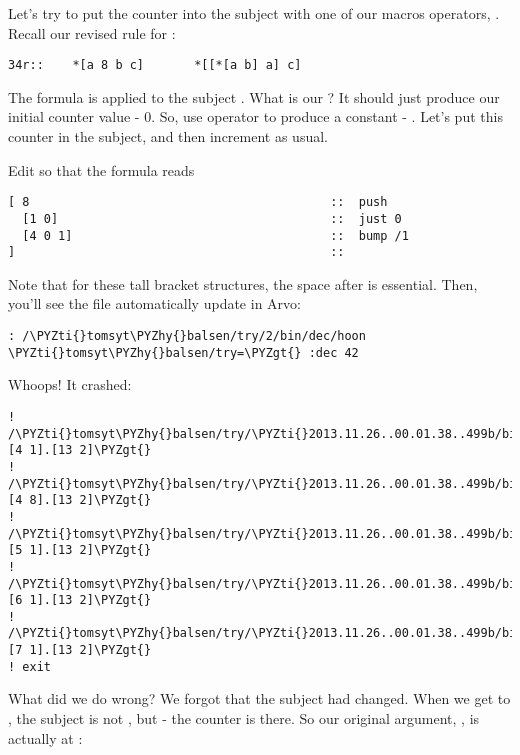 Let's try to put the counter into the subject with one of our
macros operators, .  Recall our revised rule for :

\begin{framed_shaded}
\begin{Verbatim}[fontsize=\relsize{-2.5},fontseries=b,commandchars=\\\{\}]
34r::    *[a 8 b c]       *[[*[a b] a] c]
\end{Verbatim}
\end{framed_shaded}
The formula  is applied to the subject \kode{[*[a b] a]}.  What is
our ?  It should just produce our initial counter value - 0.
So, use operator  to produce a constant - \kode{[1 0]}.  Let's
put this counter in the subject, and then increment as usual.

Edit  so that the formula reads

\begin{framed_shaded}
\begin{Verbatim}[fontsize=\relsize{-2.5},fontseries=b,commandchars=\\\{\}]
[ 8                                          ::  push
  [1 0]                                      ::  just 0
  [4 0 1]                                    ::  bump /1
]                                            ::
\end{Verbatim}
\end{framed_shaded}
Note that for these tall bracket structures, the space after \kode{[}
is essential.  Then, you'll see the file automatically update in
Arvo:

\begin{framed_shaded}
\begin{Verbatim}[fontsize=\relsize{-2.5},fontseries=b,commandchars=\\\{\}]
: /\PYZti{}tomsyt\PYZhy{}balsen/try/2/bin/dec/hoon
\PYZti{}tomsyt\PYZhy{}balsen/try=\PYZgt{} :dec 42
\end{Verbatim}
\end{framed_shaded}
Whoops!  It crashed:

\begin{framed_shaded}
\begin{Verbatim}[fontsize=\relsize{-2.5},fontseries=b,commandchars=\\\{\}]
! /\PYZti{}tomsyt\PYZhy{}balsen/try/\PYZti{}2013.11.26..00.01.38..499b/bin/dec/:\PYZlt{}[4 1].[13 2]\PYZgt{}
! /\PYZti{}tomsyt\PYZhy{}balsen/try/\PYZti{}2013.11.26..00.01.38..499b/bin/dec/:\PYZlt{}[4 8].[13 2]\PYZgt{}
! /\PYZti{}tomsyt\PYZhy{}balsen/try/\PYZti{}2013.11.26..00.01.38..499b/bin/dec/:\PYZlt{}[5 1].[13 2]\PYZgt{}
! /\PYZti{}tomsyt\PYZhy{}balsen/try/\PYZti{}2013.11.26..00.01.38..499b/bin/dec/:\PYZlt{}[6 1].[13 2]\PYZgt{}
! /\PYZti{}tomsyt\PYZhy{}balsen/try/\PYZti{}2013.11.26..00.01.38..499b/bin/dec/:\PYZlt{}[7 1].[13 2]\PYZgt{}
! exit
\end{Verbatim}
\end{framed_shaded}
What did we do wrong?  We forgot that the subject had changed.
When we get to \kode{[4 0 1]}, the subject is not , but \kode{[0 42]} -
the counter is there.  So our original argument, , is
actually at :

